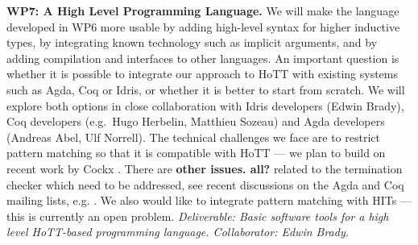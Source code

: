 \documentclass[a4paper,11pt]{article}
\newcommand{\eg}{{e.g.}\ }
\begin{document}
{\bf WP7: A High Level Programming Language.} We will make the
language developed in WP6 more usable by adding high-level syntax for
higher inductive types, by integrating known technology such as
implicit arguments, and by adding compilation and interfaces to other
languages. An important question is whether it is possible to
integrate our approach to HoTT with existing systems such as Agda, Coq
or Idris, or whether it is better to start from scratch.  We will
explore both options in close collaboration with Idris developers
(Edwin Brady), Coq developers (\eg Hugo Herbelin, Matthieu Sozeau) and
Agda developers (Andreas Abel, Ulf Norrell). The technical challenges
we face are to restrict pattern matching so that it is compatible with
HoTT --- we plan to build on recent work by Cockx
\cite{cockx-without-k}. There are {\bf other issues. all?} related to the
termination checker which need to be addressed, see recent discussions
on the Agda and Coq mailing lists, e.g. \cite{agda-issue}.  We also
would like to integrate pattern matching with HITs --- this is
currently an open problem.  {\em Deliverable: Basic software tools for
  a high level HoTT-based programming language. 
Collaborator: Edwin Brady.
}





\end{document}
